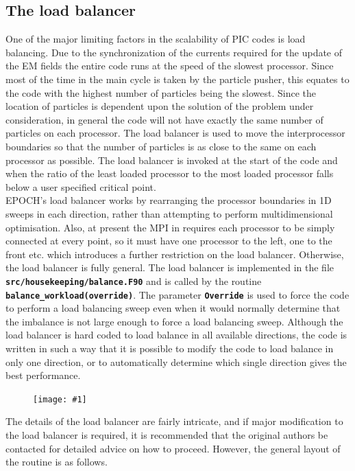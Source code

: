 \documentclass[12pt,a4paper]{article}
\newcommand{\inlinecode}[1]{{\color{warwickred} \bf\texttt{#1}}}
\newcommand{\EPOCH}{{\color{warwickdark}\fontfamily{phv}\selectfont{EPOCH}}}
\newcommand{\image}[1]
  {{\begin{figure}[hbt!]\centering\texttt{[image: \#1]}\end{figure}}}
\begin{document}
\pagebreak

\subsection{The load balancer}
One of the major limiting factors in the scalability of PIC codes is load
balancing. Due to the synchronization of the currents required for the update
of the EM fields the entire code runs at the speed of the slowest
processor. Since most of the time in the main {\EPOCH} cycle is taken by the
particle pusher, this equates to the code with the highest number of particles
being the slowest. Since the location of particles is dependent upon the
solution of the problem under consideration, in general the code will not have
exactly the same number of particles on each processor. The load balancer is
used to move the interprocessor boundaries so that the number of particles is
as close to the same on each processor as possible. The load balancer is
invoked at the start of the code and when the ratio of the least loaded
processor to the most loaded processor falls below a user specified critical
point.\\

EPOCH's load balancer works by rearranging the processor boundaries in 1D
sweeps in each direction, rather than attempting to perform multidimensional
optimisation. Also, at present the MPI in {\EPOCH} requires each processor to be
simply connected at every point, so it must have one processor to the left, one
to the front etc. which introduces a further restriction on the load
balancer. Otherwise, the load balancer is fully general. The load balancer is
implemented in the file \inlinecode{src/housekeeping/balance.F90} and is called
by the routine \inlinecode{balance\_workload(override)}. The parameter
\inlinecode{Override} is used to force the code to perform a load balancing
sweep even when it would normally determine that the imbalance is not large
enough to force a load balancing sweep. Although the load balancer is hard
coded to load balance in all available directions, the code is written in such
a way that it is possible to modify the code to load balance in only one
direction, or to automatically determine which single direction gives the best
performance.

\image{./images/sweep}

The details of the load balancer are fairly intricate, and if major
modification to the load balancer is required, it is recommended that the
original authors be contacted for detailed advice on how to proceed. However,
the general layout of the routine is as follows.
\end{document}
